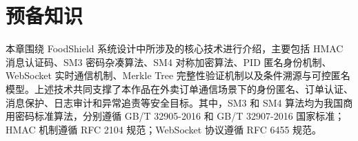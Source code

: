 %
%
\section{预备知识}

本章围绕 FoodShield 系统设计中所涉及的核心技术进行介绍，主要包括 HMAC 消息认证码、SM3 密码杂凑算法、SM4 对称加密算法、PID 匿名身份机制、WebSocket 实时通信机制、Merkle Tree 完整性验证机制以及条件溯源与可控匿名模型。上述技术共同支撑了本作品在外卖订单通信场景下的身份匿名、订单认证、消息保护、日志审计和异常追责等安全目标。其中，SM3 和 SM4 算法均为我国商用密码标准算法，分别遵循 GB/T 32905-2016 和 GB/T 32907-2016 国家标准；HMAC 机制遵循 RFC 2104 规范；WebSocket 协议遵循 RFC 6455 规范。














